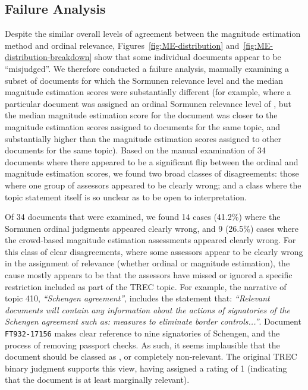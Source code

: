 \subsection{Failure Analysis}
\label{sec:failure-analysis}

Despite the similar overall levels of agreement between the magnitude
estimation method and ordinal relevance,
Figures~\ref{fig:ME-distribution}
and~\ref{fig:ME-distribution-breakdown} show that some individual
documents appear to be ``misjudged''.
We therefore conducted a failure analysis, manually examining a subset
of documents for which the Sormunen relevance level and the median
magnitude estimation scores were substantially different (for example,
where a particular document was assigned an ordinal Sormunen relevance
level of \nn, but the median magnitude estimation score for the
document was closer to the magnitude estimation scores assigned to \hh
documents for the same topic, and substantially higher than the
magnitude estimation scores assigned to other \nn documents for
the same topic).
Based on the manual examination of 34 documents where there appeared to
be a significant flip between the ordinal and magnitude estimation
scores, we found two broad classes of disagreements: those where one
group of assessors appeared to be clearly wrong; and a class
where the topic statement itself is so unclear as to be open to
interpretation.

Of 34 documents that were examined, we found 14 cases (41.2\%) where
the Sormunen ordinal judgments appeared clearly wrong, and 9 (26.5\%)
cases where the crowd-based magnitude estimation assessments
appeared clearly wrong.
For this class of clear disagreements, where some assessors appear to
be clearly wrong in the assignment of relevance (whether ordinal or
magnitude estimation), the cause mostly appears to be that the
assessors have missed or ignored a specific restriction included as
part of the TREC topic.
For example, the narrative of topic 410, \emph{``Schengen agreement''},
includes the statement that: \emph{``Relevant documents will contain
any information about the actions of signatories of the Schengen
agreement such as: measures to eliminate border controls...''}.
Document {\tt FT932-17156} makes clear reference to nine signatories of
Schengen, and the process of removing passport checks.
As such, it seems implausible that the document should be classed as 
\nn, or completely non-relevant. The original TREC binary judgment
supports this view, having assigned a rating of 1 (indicating that the
document is at least marginally relevant).

